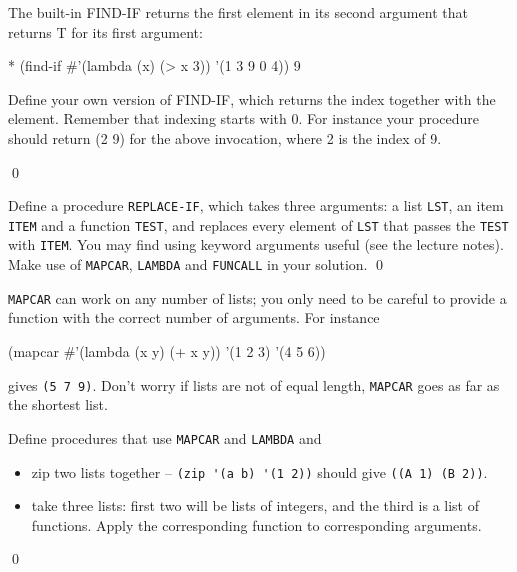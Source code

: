 \documentclass[a4paper,11pt]{article}
\begin{document}
\begin{uexercise}
The built-in FIND-IF returns the first element in its second argument that returns T for its first argument:

\begin{lispcode}
* (find-if #'(lambda (x) (> x 3)) '(1 3 9 0 4))
9
\end{lispcode}

Define your own version of FIND-IF, which returns the index together with the element. Remember
that indexing starts with 0. For instance your procedure should return (2 9) for the above invocation,
where 2 is the index of 9. 

\qed
\end{uexercise}

\begin{uexercise}

Define a procedure \Verb+REPLACE-IF+, which takes three arguments: a list \Verb+LST+, an item \Verb+ITEM+ and a function \Verb+TEST+, and replaces every element of \Verb+LST+ that passes the \Verb+TEST+ with \Verb+ITEM+. You may find using keyword arguments useful (see the lecture notes). Make use of \Verb+MAPCAR+, \Verb+LAMBDA+ and \Verb+FUNCALL+ in your solution.   
\qed
\end{uexercise}

\begin{uexercise}
\label{multi-mapcar}

\Verb+MAPCAR+ can work on any number of lists; you only need to be careful to provide a function with the correct number of arguments. For instance

\begin{lispcode}
(mapcar #'(lambda (x y) (+ x y)) '(1 2 3) '(4 5 6))
\end{lispcode}
gives \Verb+(5 7 9)+. Don't worry if lists are not of equal length, \Verb+MAPCAR+ goes as far as the shortest list.

Define procedures that use \Verb+MAPCAR+ and \Verb+LAMBDA+ and

\begin{itemize}
\item zip two lists together -- \Verb+(zip '(a b) '(1 2))+ should give \Verb+((A 1) (B 2))+. 
\item take three lists: first two will be lists of integers, and the third is a list of functions. Apply the corresponding function to corresponding arguments.
\end{itemize}

\qed
\end{uexercise}
\end{document}
